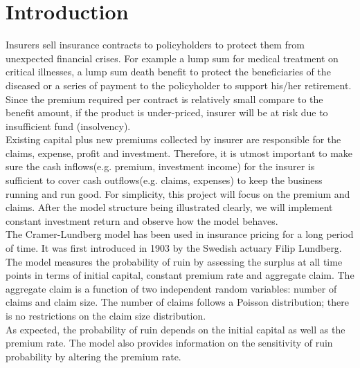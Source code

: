 \documentclass[12pt]{article}
\begin{document}
\newpage
\tableofcontents


\newpage
\section{Introduction}

\hspace{12.2mm}Insurers sell insurance contracts to policyholders to protect them from unexpected financial crises. For example a lump sum for medical treatment on critical illnesses, a lump sum death benefit to protect the beneficiaries of the diseased or a series of payment to the policyholder to support his/her retirement. Since the premium required per contract is relatively small compare to the benefit amount, if the product is under-priced, insurer will be at risk due to insufficient fund (insolvency).\\

Existing capital plus new premiums collected by insurer are responsible for the claims, expense, profit and investment. Therefore, it is utmost important to make sure the cash inflows(e.g. premium, investment income) for the insurer is sufficient to cover cash outflows(e.g. claims, expenses) to keep the business running and run good. For simplicity, this project will focus on the premium and claims. After the model structure being illustrated clearly, we will implement constant investment return and observe how the model behaves.\\

The Cramer-Lundberg model \cite{ref01} has been used in insurance pricing for a long period of time. It was first introduced in 1903 by the Swedish actuary Filip Lundberg. The model measures the probability of ruin by assessing the surplus at all time points in terms of initial capital, constant premium rate and aggregate claim. The aggregate claim is a function of two independent random variables: number of claims and claim size. The number of claims follows a Poisson distribution; there is no restrictions on the claim size distribution.\\

As expected, the probability of ruin depends on the initial capital as well as the premium rate. The model also provides information on the sensitivity of ruin probability by altering the premium rate.\\
\end{document}
